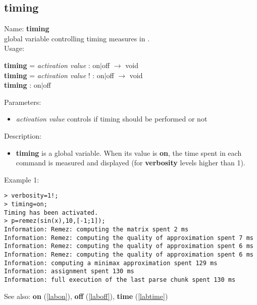 \subsection{timing}
\label{labtiming}
\noindent Name: \textbf{timing}\\
global variable controlling timing measures in \sollya.\\
\noindent Usage: 
\begin{center}
\textbf{timing} = \emph{activation value} : \textsf{on$|$off} $\rightarrow$ \textsf{void}\\
\textbf{timing} = \emph{activation value} ! : \textsf{on$|$off} $\rightarrow$ \textsf{void}\\
\textbf{timing} : \textsf{on$|$off}\\
\end{center}
Parameters: 
\begin{itemize}
\item \emph{activation value} controls if timing should be performed or not
\end{itemize}
\noindent Description: \begin{itemize}

\item \textbf{timing} is a global variable. When its value is \textbf{on}, the time spent in each 
   command is measured and displayed (for \textbf{verbosity} levels higher than 1).
\end{itemize}
\noindent Example 1: 
\begin{center}\begin{minipage}{15cm}\begin{Verbatim}[frame=single]
> verbosity=1!;
> timing=on;
Timing has been activated.
> p=remez(sin(x),10,[-1;1]);
Information: Remez: computing the matrix spent 2 ms
Information: Remez: computing the quality of approximation spent 7 ms
Information: Remez: computing the quality of approximation spent 6 ms
Information: Remez: computing the quality of approximation spent 6 ms
Information: computing a minimax approximation spent 129 ms
Information: assignment spent 130 ms
Information: full execution of the last parse chunk spent 130 ms
\end{Verbatim}
\end{minipage}\end{center}
See also: \textbf{on} (\ref{labon}), \textbf{off} (\ref{laboff}), \textbf{time} (\ref{labtime})
